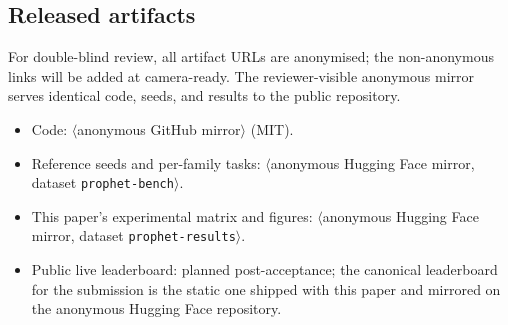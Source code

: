 \subsection{Released artifacts}
For double-blind review, all artifact URLs are anonymised; the
non-anonymous links will be added at camera-ready. The reviewer-visible
anonymous mirror serves identical code, seeds, and results to the
public repository.
\begin{itemize}
  \item Code: $\langle$anonymous GitHub mirror$\rangle$ (MIT).
  \item Reference seeds and per-family tasks: $\langle$anonymous
  Hugging Face mirror, dataset \texttt{prophet-bench}$\rangle$.
  \item This paper's experimental matrix and figures: $\langle$anonymous
  Hugging Face mirror, dataset \texttt{prophet-results}$\rangle$.
  \item Public live leaderboard: planned post-acceptance; the canonical
  leaderboard for the submission is the static one shipped with this
  paper and mirrored on the anonymous Hugging Face repository.
\end{itemize}
